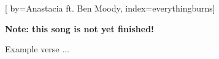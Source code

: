 

[%
    by={Anastacia ft. Ben Moody},
    index={everythingburns}]


    \label{everythingburns}

    \textbf{Note: this song is not yet finished!}

    \beginverse
        Example verse ...
    \endverse
\endsong
